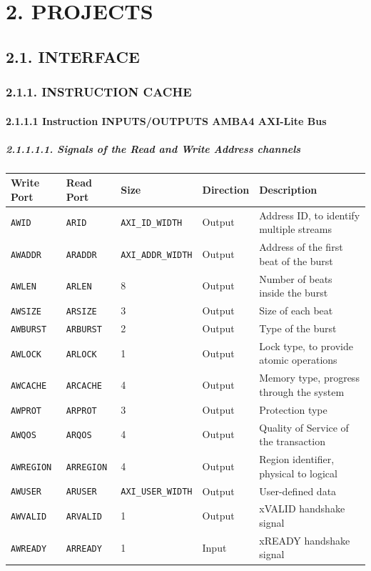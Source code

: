 \documentclass[
]{article}
\begin{document}
\hypertarget{projects}{%
\section{2. PROJECTS}\label{projects}}

\hypertarget{interface}{%
\subsection{2.1. INTERFACE}\label{interface}}

\hypertarget{instruction-cache}{%
\subsubsection{2.1.1. INSTRUCTION CACHE}\label{instruction-cache}}

\hypertarget{instruction-inputsoutputs-amba4-axi-lite-bus}{%
\paragraph{2.1.1.1 Instruction INPUTS/OUTPUTS AMBA4 AXI-Lite
Bus}\label{instruction-inputsoutputs-amba4-axi-lite-bus}}

\hypertarget{signals-of-the-read-and-write-address-channels}{%
\subparagraph{2.1.1.1.1. Signals of the Read and Write Address
channels}\label{signals-of-the-read-and-write-address-channels}}

\begin{longtable}[]{@{}lllll@{}}
\toprule
Write Port & Read Port & Size & Direction & Description\tabularnewline
\midrule
\endhead
\texttt{AWID} & \texttt{ARID} & \texttt{AXI\_ID\_WIDTH} & Output &
Address ID, to identify multiple streams\tabularnewline
\texttt{AWADDR} & \texttt{ARADDR} & \texttt{AXI\_ADDR\_WIDTH} & Output &
Address of the first beat of the burst\tabularnewline
\texttt{AWLEN} & \texttt{ARLEN} & 8 & Output & Number of beats inside
the burst\tabularnewline
\texttt{AWSIZE} & \texttt{ARSIZE} & 3 & Output & Size of each
beat\tabularnewline
\texttt{AWBURST} & \texttt{ARBURST} & 2 & Output & Type of the
burst\tabularnewline
\texttt{AWLOCK} & \texttt{ARLOCK} & 1 & Output & Lock type, to provide
atomic operations\tabularnewline
\texttt{AWCACHE} & \texttt{ARCACHE} & 4 & Output & Memory type, progress
through the system\tabularnewline
\texttt{AWPROT} & \texttt{ARPROT} & 3 & Output & Protection
type\tabularnewline
\texttt{AWQOS} & \texttt{ARQOS} & 4 & Output & Quality of Service of the
transaction\tabularnewline
\texttt{AWREGION} & \texttt{ARREGION} & 4 & Output & Region identifier,
physical to logical\tabularnewline
\texttt{AWUSER} & \texttt{ARUSER} & \texttt{AXI\_USER\_WIDTH} & Output &
User-defined data\tabularnewline
\texttt{AWVALID} & \texttt{ARVALID} & 1 & Output & xVALID handshake
signal\tabularnewline
\texttt{AWREADY} & \texttt{ARREADY} & 1 & Input & xREADY handshake
signal\tabularnewline
\bottomrule
\end{longtable}
\end{document}
